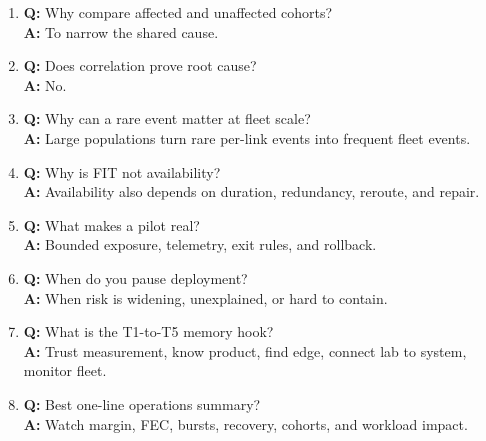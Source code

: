 \begin{enumerate}
\item \textbf{Q:} Why compare affected and unaffected cohorts?\\
\textbf{A:} To narrow the shared cause.
\item \textbf{Q:} Does correlation prove root cause?\\
\textbf{A:} No.
\item \textbf{Q:} Why can a rare event matter at fleet scale?\\
\textbf{A:} Large populations turn rare per-link events into frequent fleet
events.
\item \textbf{Q:} Why is FIT not availability?\\
\textbf{A:} Availability also depends on duration, redundancy, reroute, and
repair.
\item \textbf{Q:} What makes a pilot real?\\
\textbf{A:} Bounded exposure, telemetry, exit rules, and rollback.
\item \textbf{Q:} When do you pause deployment?\\
\textbf{A:} When risk is widening, unexplained, or hard to contain.
\item \textbf{Q:} What is the T1-to-T5 memory hook?\\
\textbf{A:} Trust measurement, know product, find edge, connect lab to system,
monitor fleet.
\item \textbf{Q:} Best one-line operations summary?\\
\textbf{A:} Watch margin, FEC, bursts, recovery, cohorts, and workload impact.
\end{enumerate}

